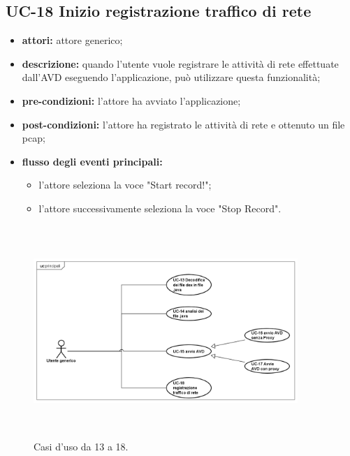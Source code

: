 \subsection*{UC-18 Inizio registrazione traffico di rete}\label{subsec:uc-18-inizio-registrazione-traffico-di-rete}
\begin{itemize}
    \item \textbf{attori:} attore generico;
    \item \textbf{descrizione:} quando l'utente vuole registrare le attività di rete effettuate dall'AVD eseguendo l'applicazione, può utilizzare questa funzionalità;
    \item \textbf{pre-condizioni:} l'attore ha avviato l'applicazione;
    \item \textbf{post-condizioni:} l'attore ha registrato le attività di rete e ottenuto un file pcap;
    \item \textbf{flusso degli eventi principali:}
    \begin{itemize}
        \item l'attore seleziona la voce "Start record!";
        \item l'attore successivamente seleziona la voce "Stop Record".
    \end{itemize}
\end{itemize}
\begin{figure}[H]
    \centering
    \includegraphics[width=10cm, height=8cm]{./immagini/usecase/UC-13_14.png}
    \caption{Casi d'uso da 13 a 18.}
\end{figure}

